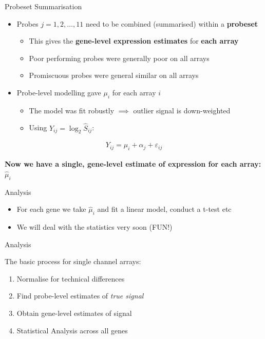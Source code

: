 \documentclass[aspectratio=169,11pt]{beamer}
\begin{document}
\begin{frame}{Probeset Summarisation}

	\begin{itemize}
		\item Probes $j = 1, 2, \ldots, 11$ need to be combined (summarised) within a \textbf{probeset}
		\begin{itemize}
			\item This gives the \textbf{gene-level expression estimates} for \textbf{each array}
			\item Poor performing probes were generally poor on all arrays
			\item Promiscuous probes were general similar on all arrays
		\end{itemize}	
		\item Probe-level modelling gave $\mu_i$ for each array $i$
		\begin{itemize}
			\item The model was fit robustly $\implies$ outlier signal is down-weighted
			\item Using $Y_{ij} = \log_2 \hat{S}_{ij}$:
		\end{itemize}
	\end{itemize}

	\begin{align*}
		Y_{ij} = \mu_i + \alpha_j + \varepsilon_{ij}
	\end{align*}
	
	\textbf{Now we have a single, gene-level estimate of expression for each array:} $\hat{\mu}_{i}$
	
\end{frame}

\begin{frame}{Analysis}

	\begin{itemize}
		\item For each gene we take $\hat{\mu}_{i}$ and fit a linear model, conduct a t-test etc
		\item We will deal with the statistics very soon (FUN!)
	\end{itemize}
	
\end{frame}

\begin{frame}{Analysis}
	
The basic process for single channel arrays:

	\begin{enumerate}
		\item Normalise for technical differences
		\item Find probe-level estimates of \textit{true signal}
		\item Obtain gene-level estimates of signal
		\item Statistical Analysis across all genes
	\end{enumerate}

\end{frame}
\end{document}
